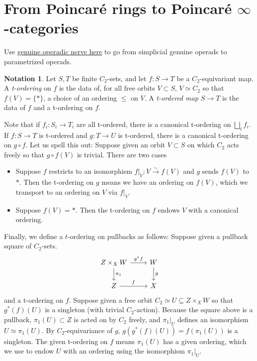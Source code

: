 \documentclass{article}
\theoremstyle{definition}
\newtheorem{notation}[equation]{Notation}
\begin{document}
\section{From Poincaré rings to Poincaré \texorpdfstring{$ \infty $}{∞}-categories}
Use \href{https://arxiv.org/pdf/1904.01465}{genuine operadic nerve here} to go from simplicial genuine operads to parametrized operads. 
\begin{notation}\label{ntn:t_order_equivariant_map}
    Let $ S, T $ be finite $ C_2 $-sets, and let $ f \colon S\to T $ be a $ C_2 $-equivariant map. 
    A \emph{t-ordering} on $ f $ is the data of, for all free orbits $ V \subset S $, $ V \simeq C_2 $ so that $ f(V) = \{*\} $, a choice of an ordering $ \le $ on $ V $. 
    A \emph{t-ordered map $ S \to T $} is the data of $ f $ and a t-ordering on $ f $.  

    Note that if $ f_i \colon S_i \to T_i $ are all t-ordered, there is a canonical t-ordering on $ \displaystyle \bigsqcup_i f_i $. 
    If $ f \colon S \to T $ is t-ordered and $ g \colon T \to U $ is t-ordered, there is a canonical t-ordering on $ g \circ f $. 
    Let us spell this out: Suppose given an orbit $ V \subset S $ on which $ C_2 $ acts freely so that $ g\circ f(V) $ is trivial. 
    There are two cases
    \begin{itemize}
        \item Suppose $ f $ restricts to an isomorphism $ f|_V \colon V \xrightarrow{\sim} f(V) $ and $ g $ sends $ f(V) $ to $ * $. 
        Then the t-ordering on $ g $ means we have an ordering on $ f(V) $, which we transport to an ordering on $ V $ via $ f|_V $. 
        \item Suppose $ f(V) = * $. 
        Then the t-ordering on $ f $ endows $ V $ with a canonical ordering.  
    \end{itemize} 
    Finally, we define a $ t $-ordering on pullbacks as follows: Suppose given a pullback square of $ C_2 $-sets. 
    \begin{equation*}
    \begin{tikzcd}
        Z \times_X W \ar[r,"{g^*f}"] \ar[d,"{\pi_1}"] &  W \ar[d,"{g}"] \\
        Z \ar[r,"f"] & X        
    \end{tikzcd}     
    \end{equation*} 
    and a t-ordering on $ f $. 
    Suppose given a free orbit $ C_2 \simeq U \subseteq Z \times_X W $ so that $ g^*(f)(U) $ is a singleton (with trivial $ C_2 $-action). 
    Because the square above is a pullback, $ \pi_1(U) \subset Z $ is acted on by $ C_2 $ freely, and $ \pi_1|_U $ defines an isomorphism $ U \simeq \pi_1(U) $. 
    By $ C_2 $-equivariance of $ g $, $ g(g^*(f)(U)) = f(\pi_1(U)) $ is a singleton. 
    The given t-ordering on $ f $ means $ \pi_1(U) $ has a given ordering, which we use to endow $ U $ with an ordering using the isomorphism $ \pi_1|_U $. 
\end{notation}
\end{document}
